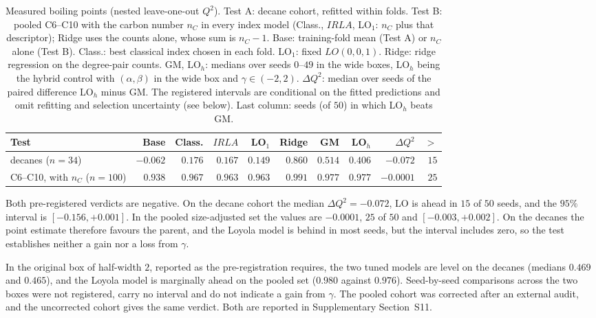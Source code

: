 \documentclass[a5paper, 10pt]{article}
\theoremstyle{plain}
\theoremstyle{remark}
\theoremstyle{definition}
\begin{document}
\begin{table}[htbp]
\centering
\caption{Measured boiling points (nested leave-one-out $Q^2$). Test A:
decane cohort, refitted within folds. Test B: pooled C6--C10 with the carbon number
$n_C$ in every index model (Class., $IRLA$,
LO$_1$: $n_C$ plus that descriptor); Ridge uses the counts alone, whose sum is $n_C - 1$. Base: training-fold mean (Test A)
or $n_C$ alone (Test B).
Class.: best classical index chosen in each fold. LO$_1$: fixed
$LO(0,0,1)$. Ridge: ridge regression on the degree-pair counts. GM,
LO$_h$: medians over seeds $0$--$49$ in the wide boxes, LO$_h$
being the hybrid control with $(\alpha,\beta)$ in the wide box and
$\gamma \in (-2,2)$.
$\Delta Q^2$: median over seeds of the paired difference LO$_h$ minus GM. The registered intervals are conditional on the fitted predictions and omit refitting and selection uncertainty (see below). Last column: seeds (of $50$) in
which LO$_h$ beats GM.}
\label{tab:bp}
\scriptsize
\setlength{\tabcolsep}{1.5pt}
\begin{tabular}{lrrrrrrrrr}
\toprule
Test & Base & Class. & $IRLA$ & LO$_1$ & Ridge & GM & LO$_h$ & $\Delta Q^2$ & $>$\\
\midrule
decanes ($n = 34$) & $-0.062$ & $0.176$ & $0.167$ & $0.149$ & $0.860$ & $0.514$ & $0.406$ & $-0.072$ & $15$\\
C6--C10, with $n_C$ ($n = 100$) & $0.938$ & $0.967$ & $0.963$ & $0.963$ & $0.991$ & $0.977$ & $0.977$ & $-0.0001$ & $25$\\
\bottomrule
\end{tabular}
\end{table}

Both pre-registered verdicts are negative. On the decane cohort the
median $\Delta Q^2 = -0.072$, LO is ahead in $15$ of $50$ seeds, and the
$95\%$ interval is $[-0.156, +0.001]$. In the pooled size-adjusted set
the values are $-0.0001$, $25$ of $50$ and $[-0.003, +0.002]$.
On the decanes the point estimate therefore favours the parent, and the
Loyola model is behind in most seeds, but the interval includes zero, so
the test establishes neither a gain nor a loss from $\gamma$.

In the
original box of half-width $2$, reported as the pre-registration
requires, the two tuned models are level on the decanes (medians $0.469$
and $0.465$), and the Loyola model is marginally ahead on the pooled set
($0.980$ against $0.976$). Seed-by-seed comparisons across the two boxes were not registered, carry no interval and do not indicate a gain from $\gamma$. The pooled cohort was corrected after an external audit, and the uncorrected cohort gives the same verdict. Both are reported in Supplementary Section~S11.
\end{document}
